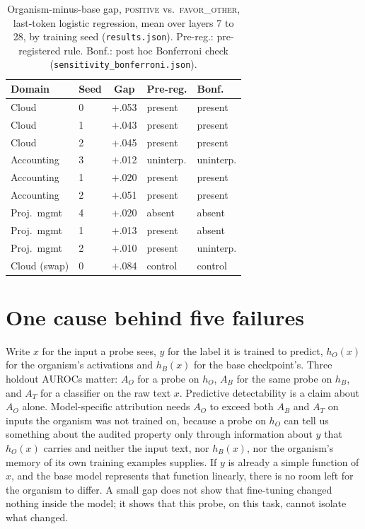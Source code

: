\documentclass[conference]{IEEEtran}
\newcommand{\cat}[1]{\textsc{\MakeLowercase{#1}}}
\newcommand{\cPOS}{\cat{POSITIVE}}
\newcommand{\cFO}{\cat{FAVOR\_OTHER}}
\begin{document}
\begin{table}[t]
\centering
\caption{Organism-minus-base gap, \cPOS{} vs.\ \cFO{}, last-token logistic regression, mean over layers 7 to 28, by training seed (\texttt{results.json}). Pre-reg.: pre-registered rule. Bonf.: post hoc Bonferroni check (\texttt{sensitivity\_bonferroni.json}).}
\label{tab:seeds}
\footnotesize
\setlength{\tabcolsep}{3pt}
\begin{tabular}{@{}llcll@{}}
\toprule
Domain & Seed & Gap & Pre-reg. & Bonf. \\
\midrule
Cloud & 0 & $+$.053 & present & present \\
Cloud & 1 & $+$.043 & present & present \\
Cloud & 2 & $+$.045 & present & present \\
Accounting & 3 & $+$.012 & uninterp. & uninterp. \\
Accounting & 1 & $+$.020 & present & present \\
Accounting & 2 & $+$.051 & present & present \\
Proj.\ mgmt & 4 & $+$.020 & absent & absent \\
Proj.\ mgmt & 1 & $+$.013 & present & absent \\
Proj.\ mgmt & 2 & $+$.010 & present & uninterp. \\
\midrule
Cloud (swap) & 0 & $+$.084 & control & control \\
\bottomrule
\end{tabular}
\end{table}

\section{One cause behind five failures}
\label{sec:cause}

Write $x$ for the input a probe sees, $y$ for the label it is trained to predict, $h_O(x)$ for the organism's activations and $h_B(x)$ for the base checkpoint's. Three holdout AUROCs matter: $A_O$ for a probe on $h_O$, $A_B$ for the same probe on $h_B$, and $A_T$ for a classifier on the raw text $x$. Predictive detectability is a claim about $A_O$ alone. Model-specific attribution needs $A_O$ to exceed both $A_B$ and $A_T$ on inputs the organism was not trained on, because a probe on $h_O$ can tell us something about the audited property only through information about $y$ that $h_O(x)$ carries and neither the input text, nor $h_B(x)$, nor the organism's memory of its own training examples supplies. If $y$ is already a simple function of $x$, and the base model represents that function linearly, there is no room left for the organism to differ. A small gap does not show that fine-tuning changed nothing inside the model; it shows that this probe, on this task, cannot isolate what changed.
\end{document}
